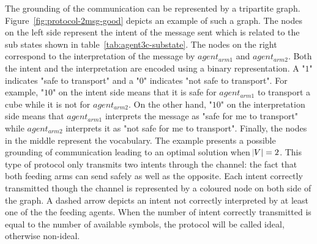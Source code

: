 The grounding of the communication can be represented by a tripartite graph. Figure~\ref{fig:protocol-2msg-good} depicts an example of such a graph. The nodes on the left side represent the intent of the message sent which is related to the sub states shown in table~\ref{tab:agent3c-substate}. The nodes on the right correspond to the interpretation of the message by $agent_{arm1}$ and $agent_{arm2}$. Both the intent and the interpretation are encoded using a binary representation. A "$1$" indicates "safe to transport" and a "$0$" indicates "not safe to transport". For example, "$10$" on the intent side means that it is safe for $agent_{arm1}$ to transport a cube while it is not for $agent_{arm2}$. On the other hand, "$10$" on the interpretation side means that $agent_{arm1}$ interprets the message as "safe for me to transport" while  $agent_{arm2}$ interprets it as "not safe for me to transport". Finally, the nodes in the middle represent the vocabulary. The example presents a possible grounding of communication leading to an optimal solution when $\abs{V} = 2$. This type of protocol only transmits two intents through the channel: the fact that both feeding arms can send safely as well as the opposite. Each intent correctly transmitted though the channel is represented by a coloured node on both side of the graph. A dashed arrow depicts an intent not correctly interpreted by at least one of the the feeding agents. When the number of intent correctly transmitted is equal to the number of available symbols, the protocol will be called ideal, otherwise non-ideal. 


